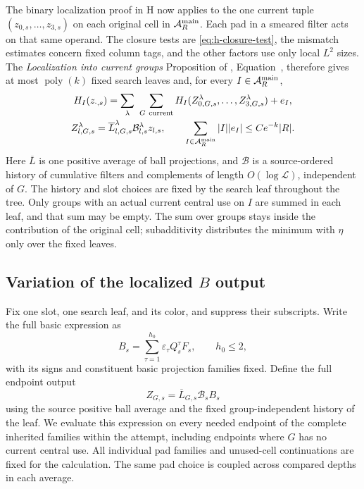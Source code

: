 The binary localization proof in H now applies to the one current
tuple \((z_{0,s},\ldots,z_{3,s})\) on each original cell in
\(\mathcal A_R^{\rm main}\).  Each pad in a smeared filter acts on
that same operand.  The closure tests are \eqref{eq:h-closure-test},
the mismatch estimates concern fixed column tags, and the other
factors use only local \(L^2\) sizes.  The
\emph{Localization into current groups} Proposition of
\cite[Section~6]{H}, Equation~, therefore gives at most
\(\operatorname{poly}(k)\) fixed search leaves and, for every
\(I\in\mathcal A_R^{\rm main}\),
\begin{equation}
 \begin{gathered}
 H_I(z_{\cdot,s})=
   \sum_\lambda\ \sum_{G\ {\rm current}}
     H_I(Z^\lambda_{0,G,s},\ldots,Z^\lambda_{3,G,s})+e_I,\\
 Z^\lambda_{l,G,s}=\overline L^\lambda_{l,G,s}
                         \mathcal B^\lambda_{l,s}z_{l,s},\qquad
 \sum_{I\in\mathcal A_R^{\rm main}}|I||e_I|\le Ce^{-k}|R|.
 \end{gathered}
 \label{eq:h-localization}
\end{equation}
Here \(\overline L\) is one positive average of ball projections,
and \(\mathcal B\) is a source-ordered history of cumulative filters
and complements of length \(O(\log\mathcal L)\), independent of
\(G\).  The history and slot choices are fixed by the search leaf
throughout the tree.  Only groups with an actual current central
use on \(I\) are summed in each leaf, and that sum may be empty.
The sum over groups stays inside
the contribution of the original cell; subadditivity distributes
the minimum with \(\eta\) only over the fixed leaves.

\subsection{\texorpdfstring{Variation of the localized \(B\) output}{Variation of the localized B output}}

Fix one slot, one search leaf, and its color, and suppress their
subscripts.  Write the full basic expression as
\[
 B_s=\sum_{\tau=1}^{h_0}\varepsilon_\tau Q_s^\tau F_s,
 \qquad h_0\le2,
\]
with its signs and constituent basic projection families fixed.
Define the full endpoint output
\[
 Z_{G,s}=\overline L_{G,s}\mathcal B_sB_s
\]
using the source positive ball average and the fixed
group-independent history of the leaf.  We evaluate this expression
on every needed endpoint of the complete inherited families within
the attempt, including endpoints where \(G\) has no current central
use.  All individual pad families and unused-cell continuations are
fixed for the calculation.  The same pad choice is coupled across
compared depths in each average.

